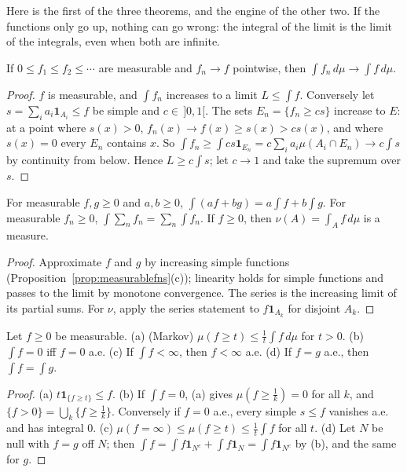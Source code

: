 Here is the first of the three theorems, and the engine of the other two. If the functions only go up, nothing can go wrong:
the integral of the limit is the limit of the integrals, even when both are infinite.

\begin{theorem}\label{thm:mct6}
If $0\le f_1\le f_2\le\cdots$ are measurable and $f_n\to f$ pointwise, then $\int f_n\,d\mu\to\int f\,d\mu$.
\end{theorem}
\begin{proof}
$f$ is measurable, and $\int f_n$ increases to a limit $L\le\int f$. Conversely let $s=\sum_ia_i\mathbf 1_{A_i}\le f$ be simple and $c\in\,]0,1[$. The sets $E_n=\{f_n\ge cs\}$ increase to $E$: at a point
where $s(x)>0$, $f_n(x)\to f(x)\ge s(x)>cs(x)$, and where $s(x)=0$ every $E_n$ contains $x$. So $\int f_n\ge\int cs\mathbf 1_{E_n}=c\sum_ia_i\mu(A_i\cap E_n)\to c\int s$ by continuity from below.
Hence $L\ge c\int s$; let $c\to1$ and take the supremum over $s$.
\end{proof}

\begin{corollary}\label{cor:linearity6}
For measurable $f,g\ge0$ and $a,b\ge0$, $\int(af+bg)=a\int f+b\int g$. For measurable $f_n\ge0$, $\int\sum_nf_n=\sum_n\int f_n$. If $f\ge0$, then $\nu(A)=\int_Af\,d\mu$ is a measure.
\end{corollary}
\begin{proof}
Approximate $f$ and $g$ by increasing simple functions (Proposition~\ref{prop:measurablefns}(c)); linearity holds for simple functions and passes to the limit by
monotone convergence. The series is the increasing limit of its partial sums. For $\nu$, apply the series statement to $f\mathbf 1_{A_k}$ for disjoint $A_k$.
\end{proof}

\begin{proposition}\label{prop:markov}
Let $f\ge0$ be measurable. (a) (Markov) $\mu(f\ge t)\le\frac1t\int f\,d\mu$ for $t>0$. (b) $\int f=0$ iff $f=0$ a.e. (c) If $\int f<\infty$, then $f<\infty$ a.e. (d) If $f=g$ a.e., then
$\int f=\int g$.
\end{proposition}
\begin{proof}
(a) $t\mathbf 1_{\{f\ge t\}}\le f$. (b) If $\int f=0$, (a) gives $\mu(f\ge\frac1k)=0$ for all $k$, and $\{f>0\}=\bigcup_k\{f\ge\frac1k\}$. Conversely if $f=0$ a.e., every simple $s\le f$ vanishes a.e. and has
integral $0$. (c) $\mu(f=\infty)\le\mu(f\ge t)\le\frac1t\int f$ for all $t$. (d) Let $N$ be null with $f=g$ off $N$; then $\int f=\int f\mathbf 1_{N^c}+\int f\mathbf 1_N=\int f\mathbf 1_{N^c}$ by (b), and the same
for $g$.
\end{proof}

